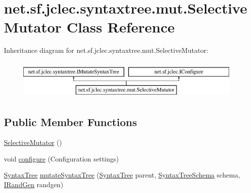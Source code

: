 \hypertarget{classnet_1_1sf_1_1jclec_1_1syntaxtree_1_1mut_1_1_selective_mutator}{\section{net.\-sf.\-jclec.\-syntaxtree.\-mut.\-Selective\-Mutator Class Reference}
\label{classnet_1_1sf_1_1jclec_1_1syntaxtree_1_1mut_1_1_selective_mutator}
}
Inheritance diagram for net.\-sf.\-jclec.\-syntaxtree.\-mut.\-Selective\-Mutator\-:\begin{figure}[H]
\begin{center}
\leavevmode
\includegraphics[height=2.000000cm]{classnet_1_1sf_1_1jclec_1_1syntaxtree_1_1mut_1_1_selective_mutator}
\end{center}
\end{figure}
\subsection*{Public Member Functions}
\begin{DoxyCompactItemize}
\item 
\hyperlink{classnet_1_1sf_1_1jclec_1_1syntaxtree_1_1mut_1_1_selective_mutator_a53c051349cf453211ce2b56a263998fe}{Selective\-Mutator} ()
\item 
void \hyperlink{classnet_1_1sf_1_1jclec_1_1syntaxtree_1_1mut_1_1_selective_mutator_ad1e56d2da4e031a14721749877767e49}{configure} (Configuration settings)
\item 
\hyperlink{classnet_1_1sf_1_1jclec_1_1syntaxtree_1_1_syntax_tree}{Syntax\-Tree} \hyperlink{classnet_1_1sf_1_1jclec_1_1syntaxtree_1_1mut_1_1_selective_mutator_a3b8db22a61953ae41ea6ef140dede05c}{mutate\-Syntax\-Tree} (\hyperlink{classnet_1_1sf_1_1jclec_1_1syntaxtree_1_1_syntax_tree}{Syntax\-Tree} parent, \hyperlink{classnet_1_1sf_1_1jclec_1_1syntaxtree_1_1_syntax_tree_schema}{Syntax\-Tree\-Schema} schema, \hyperlink{interfacenet_1_1sf_1_1jclec_1_1util_1_1random_1_1_i_rand_gen}{I\-Rand\-Gen} randgen)
\end{DoxyCompactItemize}
